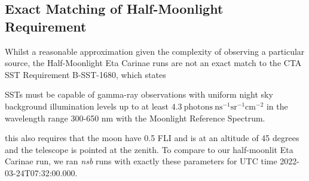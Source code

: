 \subsection{Exact Matching of Half-Moonlight Requirement}
Whilst a reasonable approximation given the complexity of observing a particular source, the Half-Moonlight Eta Carinae runs are not an exact match to the CTA SST Requirement B-SST-1680, which states
\begin{centering}
    SSTs must be capable of gamma-ray observations with uniform night sky background illumination levels up to at least $\mathrm{4.3\ photons\ ns^{-1} sr^{-1} cm^{-2}}$ in the wavelength range 300-650 nm with the Moonlight Reference Spectrum.
\end{centering}
this also requires that the moon have 0.5 FLI and is at an altitude of 45 degrees and the telescope is pointed at the zenith. To compare to our half-moonlit Eta Carinae run, we ran \textit{nsb} runs with exactly these parameters for UTC time 2022-03-24T07:32:00.000.

